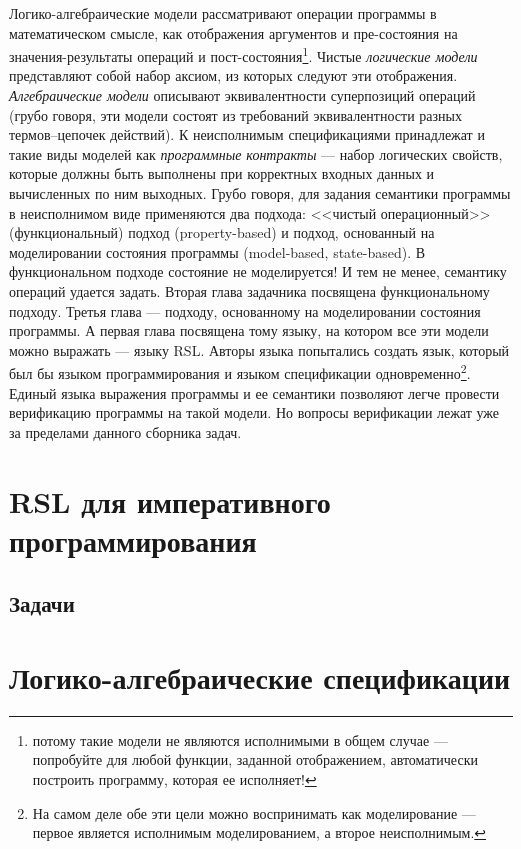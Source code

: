 \documentclass[14pt, twoside]{extreport}
\newcounter{problem_type}[chapter]
\begin{document}
Логико-алгебраические модели рассматривают операции программы в математическом смысле, как отображения аргументов и пре-состояния на значения-результаты операций и пост-состояния\footnote{потому такие модели не являются исполнимыми в общем случае --- попробуйте для любой функции, заданной отображением, автоматически построить программу, которая ее исполняет!}. Чистые \emph{логические модели} представляют собой набор аксиом, из которых следуют эти отображения. \emph{Алгебраические модели} описывают эквивалентности суперпозиций операций (грубо говоря, эти модели состоят из требований эквивалентности разных термов--цепочек действий). К неисполнимым спецификациями принадлежат и такие виды моделей как \emph{программные контракты} --- набор логических свойств, которые должны быть выполнены при корректных входных данных и вычисленных по ним выходных. Грубо говоря, для задания семантики программы в неисполнимом виде применяются два подхода: <<чистый операционный>> (функциональный) подход (property-based) и подход, основанный на моделировании состояния программы (model-based, state-based). В функциональном подходе состояние не моделируется! И тем не менее, семантику операций удается задать. Вторая глава задачника посвящена функциональному подходу. Третья глава --- подходу, основанному на моделировании состояния программы. А первая глава посвящена тому языку, на котором все эти модели можно выражать --- языку RSL. Авторы языка попытались создать язык, который был бы языком программирования и языком спецификации одновременно\footnote{На самом деле обе эти цели можно воспринимать как моделирование --- первое является исполнимым моделированием, а второе неисполнимым.}. Единый языка выражения программы и ее семантики позволяют легче провести верификацию программы на такой модели. Но вопросы верификации лежат уже за пределами данного сборника задач.

\chapter{RSL для императивного программирования}



\section*{Задачи}




\chapter{Логико-алгебраические спецификации}
\end{document}
